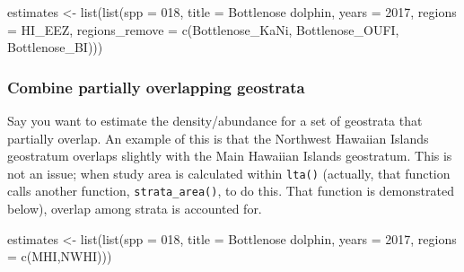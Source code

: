 \documentclass[
]{book}
\newenvironment{Shaded}{\begin{snugshade}}{\end{snugshade}}
\newcommand{\AttributeTok}[1]{\textcolor[rgb]{0.77,0.63,0.00}{#1}}
\newcommand{\DecValTok}[1]{\textcolor[rgb]{0.00,0.00,0.81}{#1}}
\newcommand{\FunctionTok}[1]{\textcolor[rgb]{0.00,0.00,0.00}{#1}}
\newcommand{\NormalTok}[1]{#1}
\newcommand{\OtherTok}[1]{\textcolor[rgb]{0.56,0.35,0.01}{#1}}
\newcommand{\StringTok}[1]{\textcolor[rgb]{0.31,0.60,0.02}{#1}}
\begin{document}
\begin{Shaded}
\begin{Highlighting}[]
\NormalTok{estimates }\OtherTok{\textless{}{-}} \FunctionTok{list}\NormalTok{(}\FunctionTok{list}\NormalTok{(}\AttributeTok{spp =} \StringTok{\textquotesingle{}018\textquotesingle{}}\NormalTok{,}
                       \AttributeTok{title =} \StringTok{\textquotesingle{}Bottlenose dolphin\textquotesingle{}}\NormalTok{,}
                       \AttributeTok{years =} \DecValTok{2017}\NormalTok{,}
                       \AttributeTok{regions =} \StringTok{\textquotesingle{}HI\_EEZ\textquotesingle{}}\NormalTok{,}
                       \AttributeTok{regions\_remove =} \FunctionTok{c}\NormalTok{(}\StringTok{\textquotesingle{}Bottlenose\_KaNi\textquotesingle{}}\NormalTok{,}
                                          \StringTok{\textquotesingle{}Bottlenose\_OUFI\textquotesingle{}}\NormalTok{,}
                                          \StringTok{\textquotesingle{}Bottlenose\_BI\textquotesingle{}}\NormalTok{)))}
\end{Highlighting}
\end{Shaded}

\hypertarget{combine-partially-overlapping-geostrata}{%
\subsubsection*{Combine partially overlapping geostrata}\label{combine-partially-overlapping-geostrata}}

Say you want to estimate the density/abundance for a set of geostrata that partially overlap. An example of this is that the Northwest Hawaiian Islands geostratum overlaps slightly with the Main Hawaiian Islands geostratum. This is not an issue; when study area is calculated within \texttt{lta()} (actually, that function calls another function, \texttt{strata\_area()}, to do this. That function is demonstrated below), overlap among strata is accounted for.

\begin{Shaded}
\begin{Highlighting}[]
\NormalTok{estimates }\OtherTok{\textless{}{-}} \FunctionTok{list}\NormalTok{(}\FunctionTok{list}\NormalTok{(}\AttributeTok{spp =} \StringTok{\textquotesingle{}018\textquotesingle{}}\NormalTok{,}
                       \AttributeTok{title =} \StringTok{\textquotesingle{}Bottlenose dolphin\textquotesingle{}}\NormalTok{,}
                       \AttributeTok{years =} \DecValTok{2017}\NormalTok{,}
                       \AttributeTok{regions =} \FunctionTok{c}\NormalTok{(}\StringTok{\textquotesingle{}MHI\textquotesingle{}}\NormalTok{,}\StringTok{\textquotesingle{}NWHI\textquotesingle{}}\NormalTok{)))}
\end{Highlighting}
\end{Shaded}
\end{document}
